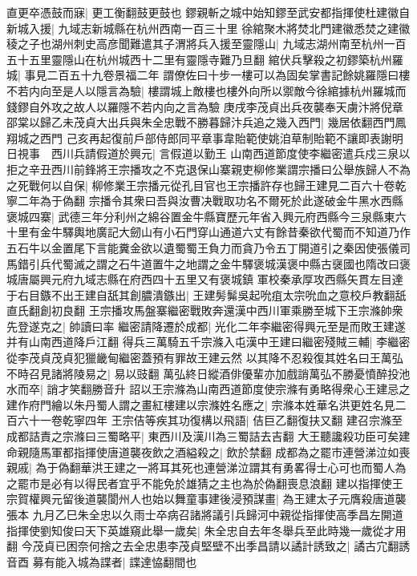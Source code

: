 直更卒憑鼓而寐|{
	更工衡翻鼓更鼓也}
鏐親斬之城中始知鏐至武安都指揮使杜建徽自新城入援|{
	九域志新城縣在杭州西南一百三十里}
徐綰聚木將焚北門建徽悉焚之建徽稜之子也湖州刺史高彦聞難遣其子渭將兵入援至靈隱山|{
	九域志湖州南至杭州一百五十五里靈隱山在杭州城西十二里有靈隱寺難乃旦翻}
綰伏兵擊殺之初鏐築杭州羅城|{
	事見二百五十九卷景福二年}
謂僚佐曰十步一樓可以為固矣掌書記餘姚羅隱曰樓不若内向至是人以隱言為驗|{
	樓謂城上敵樓也樓外向所以禦敵今徐綰據杭州羅城而錢鏐自外攻之故人以羅隱不若内向之言為驗}
庚戌李茂貞出兵夜襲奉天虜汴將倪章邵棠以歸乙未茂貞大出兵與朱全忠戰不勝暮歸汴兵追之幾入西門|{
	幾居依翻西門鳳翔城之西門}
己亥再起復前戶部侍郎同平章事韋貽範使姚洎草制貽範不讓即表謝明日視事　西川兵請假道於興元|{
	言假道以勤王}
山南西道節度使李繼密遣兵戍三泉以拒之辛丑西川前鋒將王宗播攻之不克退保山寨親吏柳修業謂宗播曰公舉族歸人不為之死戰何以自保|{
	柳修業王宗播元從孔目官也王宗播許存也歸王建見二百六十卷乾寧二年為于偽翻}
宗播令其衆曰吾與汝曹决戰取功名不爾死於此遂破金牛黑水西縣褒城四寨|{
	武德三年分利州之綿谷置金牛縣寶歷元年省入興元府西縣今三泉縣東六十里有金牛驛輿地廣記大劒山有小石門穿山通道六丈有餘昔秦欲代蜀而不知道乃作五石牛以金置尾下言能糞金欲以遺蜀蜀王負力而貪乃令五丁開道引之秦因使張儀司馬錯引兵代蜀滅之謂之石牛道置牛之地謂之金牛驛褒城漢褒中縣古襃國也隋改曰褒城唐屬興元府九域志縣在府西四十五里又有褒城鎮}
軍校秦承厚攻西縣矢貫左目達于右目鏃不出王建自舐其創膿潰鏃出|{
	王建髣髴吳起吮疽太宗吮血之意校戶教翻舐直氏翻創初良翻}
王宗播攻馬盤寨繼密戰敗奔還漢中西川軍乘勝至城下王宗滌帥衆先登遂克之|{
	帥讀曰率}
繼密請降遷於成都|{
	光化二年李繼密得興元至是而敗王建遂并有山南西道降戶江翻}
得兵三萬騎五千宗滌入屯漢中王建曰繼密殘賊三輔|{
	李繼密從李茂貞茂貞犯獵畿甸繼密蓋預有罪故王建云然}
以其降不忍殺復其姓名曰王萬弘不時召見諸將陵易之|{
	易以豉翻}
萬弘終日縱酒俳優輩亦加戲誚萬弘不勝憂憤醉投池水而卒|{
	誚才笑翻勝音升}
詔以王宗滌為山南西道節度使宗滌有勇略得衆心王建忌之建作府門繪以朱丹蜀人謂之畫紅樓建以宗滌姓名應之|{
	宗滌本姓華名洪更姓名見二百六十一卷乾寧四年}
王宗佶等疾其功復構以飛語|{
	佶巨乙翻復扶又翻}
建召宗滌至成都詰責之宗滌曰三蜀略平|{
	東西川及漢川為三蜀詰去吉翻}
大王聽讒殺功臣可矣建命親隨馬軍都指揮使唐道襲夜飲之酒縊殺之|{
	飲於禁翻}
成都為之罷市連營涕泣如喪親戚|{
	為于偽翻華洪王建之一將耳其死也連營涕泣謂其有勇畧得士心可也而蜀人為之罷市是必有以得民者宜乎不能免於雄猜之主也為於偽翻喪息浪翻}
建以指揮使王宗賀權興元留後道襲閬州人也始以舞童事建後浸預謀畫|{
	為王建太子元膺殺唐道襲張本}
九月乙巳朱全忠以久雨士卒病召諸將議引兵歸河中親從指揮使高季昌左開道指揮使劉知俊曰天下英雄窺此舉一歲矣|{
	朱全忠自去年冬舉兵至此時幾一歲從才用翻}
今茂貞已困奈何捨之去全忠患李茂貞堅壁不出季昌請以譎計誘致之|{
	譎古宂翻誘音酉}
募有能入城為諜者|{
	諜達恊翻間也}
